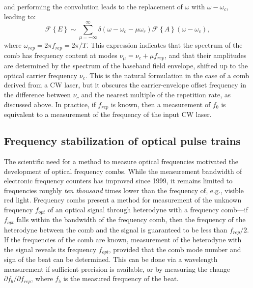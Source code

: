 and performing the convolution leads to the replacement of $\omega$ with $\omega-\omega_c$, leading to:
\begin{equation}
\mathcal{F}\left\{E\right\}\sim\sum_{\mu=-\infty}^{\infty}\delta\left(\omega-\omega_c-\mu\omega_r\right)\mathcal{F}\left\{A\right\}(\omega-\omega_c), \label{eq:combspectrum}
\end{equation}
where $\omega_{rep}=2\pi f_{rep}=2\pi/T$. This expression indicates that the spectrum of the comb has frequency content at modes $\nu_\mu=\nu_c+\mu f_{rep}$, and that their amplitudes are determined by the spectrum of the baseband field envelope, shifted up to the optical carrier frequency $\nu_c$. This is the natural formulation in the case of a comb derived from a CW laser, but it obscures the carrier-envelope offset frequency in the difference between $\nu_c$ and the nearest multiple of the repetition rate, as discussed above. In practice, if $f_{rep}$ is known, then a measurement of $f_0$ is equivalent to a measurement of the frequency of the input CW laser.


\subsection{Frequency stabilization of optical pulse trains}

The scientific need for a method to measure optical frequencies motivated the development of optical frequency combs. While the measurement bandwidth of electronic frequency counters has improved since 1999, it remains limited to frequencies roughly \textit{ten thousand} times lower than the frequency of, e.g., visible red light. Frequency combs present a method for measurement of the unknown frequency $f_{opt}$ of an optical signal through heterodyne with a frequency comb---if $f_{opt}$ falls within the bandwidth of the frequency comb, then the frequency of the heterodyne between the comb and the signal is guaranteed to be less than $f_{rep}/2$. If the frequencies of the comb are known, measurement of the heterodyne with the signal reveals its frequency  $f_{opt}$, provided that the comb mode number and sign of the beat can be determined. This can be done via a wavelength measurement if sufficient precision is available, or by measuring the change $\partial f_b/\partial f_{rep}$, where $f_b$ is the measured frequency of the beat.

